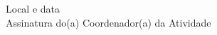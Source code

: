 \documentclass[12pt,a4paper,oneside]{article}%
\begin{document}
\raggedleft%
\bigskip%
\begin{minipage}{.5\textwidth}%
\begin{center}%
\hrulefill%
\newline%
\bigskip%
\bigskip%
Local e data \\%
\hrulefill%
\newline%
\bigskip%
Assinatura do(a) Coordenador(a) da Atividade%
\end{center}%
\end{minipage}%
\end{document}
